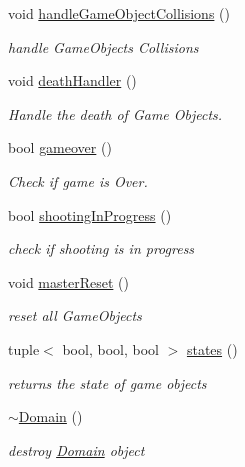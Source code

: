 \begin{DoxyCompactItemize}
\mbox{\label{class_domain_ada593a3293443a881bd1747bed14a3b0}} 
void \mbox{\hyperlink{class_domain_ada593a3293443a881bd1747bed14a3b0}{handle\+Game\+Object\+Collisions}} ()
\begin{DoxyCompactList}\small\item\em handle Game\+Objects Collisions \end{DoxyCompactList}\item 
\mbox{\label{class_domain_a0dd81d0b3e57a98a21f49b41bc46bd9d}} 
void \mbox{\hyperlink{class_domain_a0dd81d0b3e57a98a21f49b41bc46bd9d}{death\+Handler}} ()
\begin{DoxyCompactList}\small\item\em Handle the death of Game Objects. \end{DoxyCompactList}\item 
bool \mbox{\hyperlink{class_domain_acdd42563f2efe7a6c91e7c968f1e2f8b}{gameover}} ()
\begin{DoxyCompactList}\small\item\em Check if game is Over. \end{DoxyCompactList}\item 
bool \mbox{\hyperlink{class_domain_a2c965d6ecca1739641f4959e183fe80c}{shooting\+In\+Progress}} ()
\begin{DoxyCompactList}\small\item\em check if shooting is in progress \end{DoxyCompactList}\item 
\mbox{\label{class_domain_ac9d5fae35815f68b9449f76da3770e9e}} 
void \mbox{\hyperlink{class_domain_ac9d5fae35815f68b9449f76da3770e9e}{master\+Reset}} ()
\begin{DoxyCompactList}\small\item\em reset all Game\+Objects \end{DoxyCompactList}\item 
tuple$<$ bool, bool, bool $>$ \mbox{\hyperlink{class_domain_a28dd947d21159cbf30ec80b1d215772f}{states}} ()
\begin{DoxyCompactList}\small\item\em returns the state of game objects \end{DoxyCompactList}\item 
\mbox{\label{class_domain_a29cec9afb2e54c810ba1f3c1a49543a8}} 
\mbox{\hyperlink{class_domain_a29cec9afb2e54c810ba1f3c1a49543a8}{$\sim$\+Domain}} ()
\begin{DoxyCompactList}\small\item\em destroy \mbox{\hyperlink{class_domain}{Domain}} object \end{DoxyCompactList}\end{DoxyCompactItemize}
